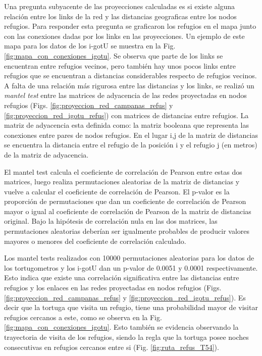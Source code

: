 Una pregunta subyacente de las proyecciones calculadas es si existe alguna relación entre los links de la red y las distancias geograficas entre los nodos refugios. Para responder esta pregunta se graficaron los refugios en el mapa junto con las conexiones dadas por los links en las proyecciones. Un ejemplo de este mapa para los datos de los i-gotU se muestra en la Fig. \ref{fig:mapa_con_conexiones_igotu}. Se observa que parte de los links se encuentran entre refugios vecinos, pero también hay unos pocos links entre refugios que se encuentran a distancias considerables respecto de refugios vecinos. A falta de una relación más rigurosa entre las distancias y los links, se realizó un \textit{mantel test} \cite{MantelTest} entre las matrices de adyacencia de las redes proyectadas en nodos refugios (Figs. \ref{fig:proyeccion_red_campanas_refus} y \ref{fig:proyeccion_red_igotu_refus}) con matrices de distancias entre refugios. La matriz de adyacencia esta definida como: la matriz booleana que representa las conexiones entre pares de nodos refugios. En el lugar i,j de la matriz de distancias se encuentra la distancia entre el refugio  de la posición i y el refugio j (en metros) de la matriz de adyacencia.
 
El mantel test calcula el coeficiente de correlación de Pearson entre estas dos matrices, luego realiza permutaciones aleatorias de la matriz de distancias y vuelve a calcular el coeficiente de correlación de Pearson. El p-valor es la proporción de permutaciones que dan un coeficiente de correlación de Pearson mayor o igual al coeficiente de correlación de Pearson de la matriz de distancias original. Bajo la hipótesis de correlación nula en las dos matrices, las permutaciones aleatorias deberían ser igualmente probables de producir valores mayores o menores del coeficiente de correlación calculado.
 
 
Los mantel tests realizados con 10000 permutaciones aleatorias para los datos de los tortugometros y los i-gotU dan un p-valor de 0.0051 y 0.0001 respectivamente. Esto indica que existe una correlación significativa entre las distancias entre refugios y los enlaces en las redes proyectadas en nodos refugios (Figs. \ref{fig:proyeccion_red_campanas_refus} y \ref{fig:proyeccion_red_igotu_refus}). Es decir que la tortuga que visita un refugio, tiene una probabilidad mayor de visitar refugios cercanos a este, como se observa en la Fig. \ref{fig:mapa_con_conexiones_igotu}. Esto también se evidencia observando la trayectoria de visita de los refugios, siendo la regla que la tortuga posee noches consecutivas en refugios cercanos entre si (Fig. \ref{fig:ruta_refus_T54}).
 
